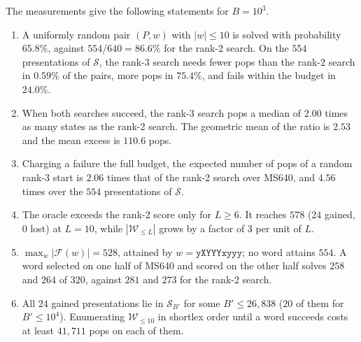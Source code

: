\documentclass[11pt]{article}
\theoremstyle{definition}
\theoremstyle{remark}
\newcommand{\Sol}{\mathcal{S}}
\newcommand{\Fix}{\mathcal{F}}
\newcommand{\W}{\mathcal{W}}
\begin{document}
\noindent The measurements give the following statements for $B=10^3$.
\begin{enumerate}
  \item A uniformly random pair $(P,w)$ with $|w|\le10$ is solved with probability $65.8\%$, against $554/640=86.6\%$
  for the rank-2 search. On the $554$ presentations of $\Sol$, the rank-3 search needs fewer pops than the rank-2
  search in $0.59\%$ of the pairs, more pops in $75.4\%$, and fails within the budget in $24.0\%$.
  \item When both searches succeed, the rank-3 search pops a median of $2.00$ times as many states as the rank-2 search.
  The geometric mean of the ratio is $2.53$ and the mean excess is $110.6$ pops.
  \item Charging a failure the full budget, the expected number of pops of a random rank-3 start is $2.06$ times that of
  the rank-2 search over MS640, and $4.56$ times over the $554$ presentations of $\Sol$.
  \item The oracle exceeds the rank-2 score only for $L\ge6$. It reaches $578$ ($24$ gained, $0$ lost) at $L=10$, while
  $|\W_{\le L}|$ grows by a factor of $3$ per unit of $L$.
  \item $\max_{w}|\Fix(w)|=528$, attained by $w=\texttt{yXYYYxyyy}$; no word attains $554$. A word selected on one half
  of MS640 and scored on the other half solves $258$ and $264$ of $320$, against $281$ and $273$ for the rank-2 search.
  \item All $24$ gained presentations lie in $\Sol_{B'}$ for some $B'\le26{,}838$ ($20$ of them for $B'\le10^4$).
  Enumerating $\W_{\le10}$ in shortlex order until a word succeeds costs at least $41{,}711$ pops on each of them.
\end{enumerate}
\end{document}
